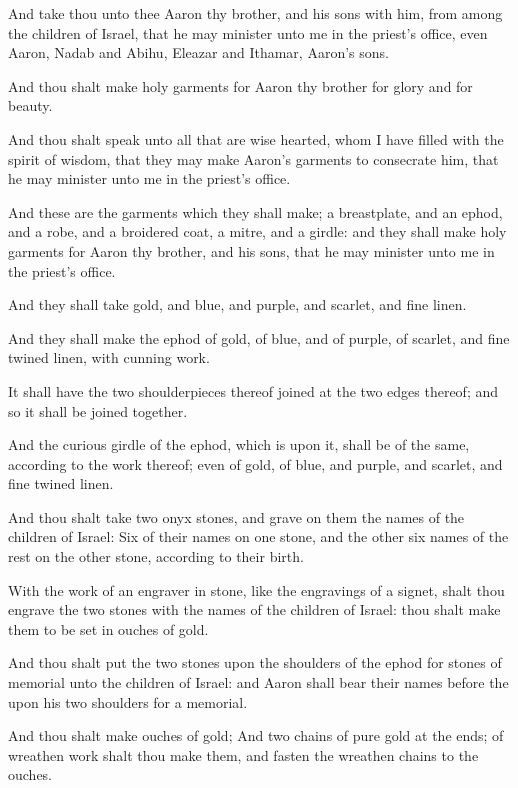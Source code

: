\Chapter
\Verse And take thou unto thee Aaron thy brother, and his sons with him, from among the children of Israel, that he may minister unto me in the priest's office, even Aaron, Nadab and Abihu, Eleazar and Ithamar, Aaron's sons.

\Verse And thou shalt make holy garments for Aaron thy brother for glory and for beauty.

\Verse And thou shalt speak unto all that are wise hearted, whom I have filled with the spirit of wisdom, that they may make Aaron's garments to consecrate him, that he may minister unto me in the priest's office.

\Verse And these are the garments which they shall make; a breastplate, and an ephod, and a robe, and a broidered coat, a mitre, and a girdle: and they shall make holy garments for Aaron thy brother, and his sons, that he may minister unto me in the priest's office.

\Verse And they shall take gold, and blue, and purple, and scarlet, and fine linen.

\Verse And they shall make the ephod of gold, of blue, and of purple, of scarlet, and fine twined linen, with cunning work.

\Verse It shall have the two shoulderpieces thereof joined at the two edges thereof; and so it shall be joined together.

\Verse And the curious girdle of the ephod, which is upon it, shall be of the same, according to the work thereof; even of gold, of blue, and purple, and scarlet, and fine twined linen.

\Verse And thou shalt take two onyx stones, and grave on them the names of the children of Israel: \Verse Six of their names on one stone, and the other six names of the rest on the other stone, according to their birth.

\Verse With the work of an engraver in stone, like the engravings of a signet, shalt thou engrave the two stones with the names of the children of Israel: thou shalt make them to be set in ouches of gold.

\Verse And thou shalt put the two stones upon the shoulders of the ephod for stones of memorial unto the children of Israel: and Aaron shall bear their names before the \LORD upon his two shoulders for a memorial.

\Verse And thou shalt make ouches of gold; \Verse And two chains of pure gold at the ends; of wreathen work shalt thou make them, and fasten the wreathen chains to the ouches.

